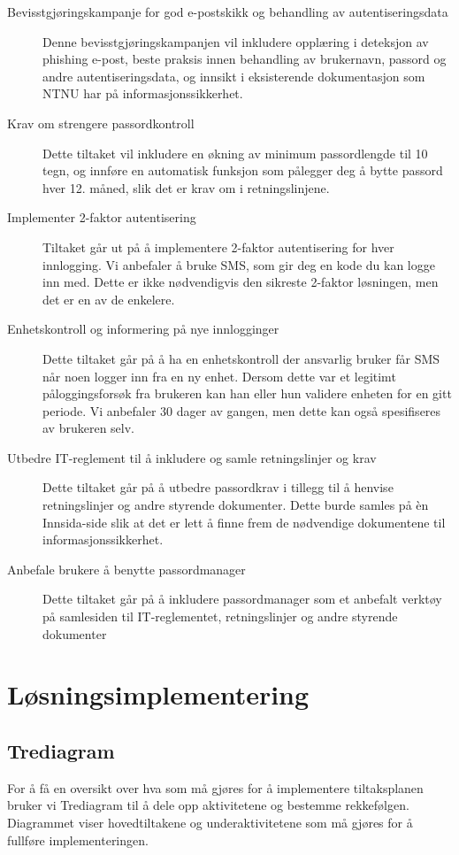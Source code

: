 \begin{description}
    \item[Bevisstgjøringskampanje for god e-postskikk og behandling av autentiseringsdata] Denne bevisstgjøringskampanjen vil inkludere opplæring i deteksjon av phishing e-post, beste praksis innen behandling av brukernavn, passord og andre autentiseringsdata, og innsikt i eksisterende dokumentasjon som NTNU har på informasjonssikkerhet. 
    \item[Krav om strengere passordkontroll] Dette tiltaket vil inkludere en økning av minimum passordlengde til 10 tegn, og innføre en automatisk funksjon som pålegger deg å bytte passord hver 12. måned, slik det er krav om i retningslinjene. 
    \item[Implementer 2-faktor autentisering] Tiltaket går ut på å implementere 2-faktor autentisering for hver innlogging. Vi anbefaler å bruke SMS, som gir deg en kode du kan logge inn med. Dette er ikke nødvendigvis den sikreste 2-faktor løsningen, men det er en av de enkelere.
    \item[Enhetskontroll og informering på nye innlogginger] Dette tiltaket går på å ha en enhetskontroll der ansvarlig bruker får SMS når noen logger inn fra en ny enhet. Dersom dette var et legitimt påloggingsforsøk fra brukeren kan han eller hun validere enheten for en gitt periode. Vi anbefaler 30 dager av gangen, men dette kan også spesifiseres av brukeren selv. 
    \item[Utbedre IT-reglement til å inkludere og samle retningslinjer og krav] Dette tiltaket går på å utbedre passordkrav i tillegg til å henvise retningslinjer og andre styrende dokumenter. Dette burde samles på èn Innsida-side slik at det er lett å finne frem de nødvendige dokumentene til informasjonssikkerhet. 
    \item[Anbefale brukere å benytte passordmanager] Dette tiltaket går på å inkludere passordmanager som et anbefalt verktøy på samlesiden til IT-reglementet, retningslinjer og andre styrende dokumenter
\end{description}

\section{Løsningsimplementering}

\subsection{Trediagram}
For å få en oversikt over hva som må gjøres for å implementere tiltaksplanen bruker vi Trediagram til å dele opp aktivitetene og bestemme rekkefølgen. Diagrammet viser hovedtiltakene og underaktivitetene som må gjøres for å fullføre implementeringen. 

